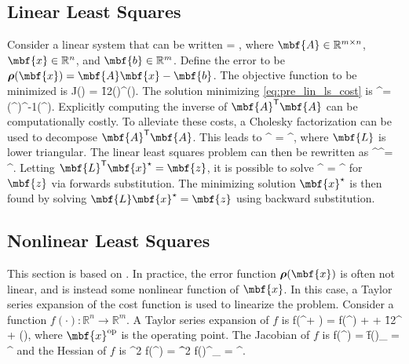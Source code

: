 \subsection{Linear Least Squares}

Consider a linear system that can be written 
\bdis
	 = ,
\edis
where $\mbf{A} \in \mathbb{R}^{m \times n}$, $\mbf{x} \in \mathbb{R}^{n}$, and $\mbf{b} \in \mathbb{R}^{m}$. Define the error to be $\mbs{\rho}(\mbf{x}) = \mbf{A}\mbf{x} - \mbf{b}$. The objective function to be minimized is
\beq
	J() = \f{1}{2}\mbs{\rho}()^\trans\mbs{\rho}(). \label{eq:pre_lin_ls_cost}
\eeq
The solution minimizing \eqref{eq:pre_lin_ls_cost} is
\bdis	
	^\star = \left(^\trans{}\right)^{-1}\left(^\trans{}\right).
\edis
Explicitly computing the inverse of $\mbf{A}^\trans\mbf{A}$ can be computationally costly. To alleviate these costs, a Cholesky factorization can be used to decompose $\mbf{A}^\trans\mbf{A}$. This leads to
\bdis
	^\trans{} = ^\trans,
\edis
where $\mbf{L}$ is lower triangular. The linear least squares problem can then be rewritten as
\bdis
	^\trans{}^\star = ^\trans{}.
\edis
Letting $\mbf{L}^\trans\mbf{x}^\star = \mbf{z}$, it is possible to solve
\bdis	
	^\trans{} = ^\trans{}
\edis 
for $\mbf{z}$ via forwards substitution. The minimizing solution $\mbf{x}^\star$ is then found by solving $\mbf{L}\mbf{x}^\star = \mbf{z}$ using backward substitution.

\subsection{Nonlinear Least Squares}

This section is based on \cite{Barfoot2017}. In practice, the error function $\mbs{\rho}(\mbf{x})$ is often not linear, and is instead some nonlinear function of $\mbf{x}$. In this case, a Taylor series expansion of the cost function is used to linearize the problem. Consider a function $f(\cdot):\mathbb{R}^n \to \mathbb{R}^m$. A Taylor series expansion of $f$ is
\bdis
	f(^\op + ) = f(^\op) + \left[\f{\partial f(\mbf{x})}{\partial \mbf{x}}\bigg\rvert_{\mbf{x} = \mbf{x}^\op} \right] + \f{1}{2}^\trans\left[\f{\partial^2 f(\mbf{x})}{\partial \mbf{x}\partial \mbf{x}^\trans}\bigg\rvert_{\mbf{x} = \mbf{x}^\op}\right]  + \left(\right),
\edis  
where $\mbf{x}^\op$ is the operating point. 
The Jacobian of $f$ is
\bdis
	\nabla f(^\op) = \f{\partial f()}{\partial {}}\bigg\rvert_{ = ^\op} 
\edis
and the Hessian of $f$ is
\bdis
	\nabla^2 f(^\op) = \f{\partial^2 f()}{\partial {}\partial {}^\trans}\bigg\rvert_{ = ^\op}.
\edis


